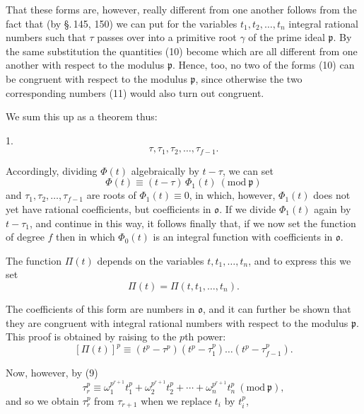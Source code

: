 That these forms are, however, really different from one another
follows from the fact that (by \S.\,145, 150) we can put for the
variables $t_1, t_2, \ldots, t_n$ integral rational numbers such
that $\tau$ passes over into a primitive root $\gamma$ of the prime
ideal $\mathfrak p$. By the same substitution the quantities (10)
become
which are all different from one another with respect to the modulus
$\mathfrak p$. Hence, too, no two of the forms (10) can be congruent
with respect to the modulus $\mathfrak p$, since otherwise the two
corresponding numbers (11) would also turn out congruent.

We sum this up as a theorem thus:

1. 
\[
\tau, \tau_1, \tau_2, \ldots, \tau_{f-1}.
\]

Accordingly, dividing $\Phi(t)$ algebraically by $t - \tau$, we can
set
\[
\Phi(t) \equiv (t - \tau)\, \Phi_1(t)\ (\mathrm{mod}\ \mathfrak p)
\]
and $\tau_1, \tau_2, \ldots, \tau_{f-1}$ are roots of
$\Phi_1(t) \equiv 0$, in which, however, $\Phi_1(t)$ does not yet
have rational coefficients, but coefficients in $\mathfrak o$. If we
divide $\Phi_1(t)$ again by $t - \tau_1$, and continue in this way,
it follows finally that, if we now set the function of degree $f$
then
in which $\Phi_0(t)$ is an integral function with coefficients in
$\mathfrak o$.

The function $\Pi(t)$ depends on the variables $t, t_1, \ldots, t_n$,
and to express this we set
\[
\Pi(t) = \Pi(t, t_1, \ldots, t_n).
\]

The coefficients of this form are numbers in $\mathfrak o$, and it
can further be shown that they are congruent with integral rational
numbers with respect to the modulus $\mathfrak p$. This proof is
obtained by raising to the $p$th power:
\[
[\Pi(t)]^p \equiv (t^p - \tau^p)(t^p - \tau_1^p) \ldots (t^p - \tau_{f-1}^p).
\]

Now, however, by (9)
\[
\tau_r^p \equiv \omega_1^{p^{r+1}} t_1^p + \omega_2^{p^{r+1}} t_2^p + \cdots + \omega_n^{p^{r+1}} t_n^p\ (\mathrm{mod}\ \mathfrak p),
\]
and so we obtain $\tau_r^p$ from $\tau_{r+1}$ when we replace $t_i$
by $t_i^p$,
